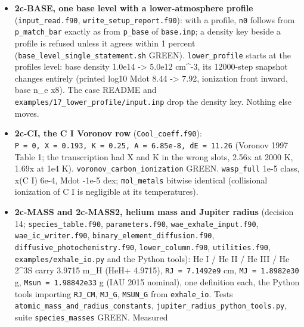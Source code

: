 \documentclass[english,a4paper]{my_memo}
\begin{document}
\begin{itemize}
  \texttt{restart\_grid\_guard.sh} GREEN; \texttt{roundtrip} and the three \texttt{hp\_*} cases
  byte-identical on the same grid. Consequence: after the grid-moving items
  of this batch (RJ +2.26 percent of the domain in R\_p units, \texttt{dr\_j}) the
  shipped \texttt{hp\_*} IC pairs are refused, and are regenerated with
  \texttt{backup/regression/make\_hp\_initial\_conditions.py} from a fresh
  \texttt{mol\_base\_handoff} output (below).
\item
  \textbf{2c-BASE, one base level with a lower-atmosphere profile}
  (\texttt{input\_read.f90}, \texttt{write\_setup\_report.f90}): with a profile, \texttt{n0} follows
  from \texttt{p\_match\_bar} exactly as from \texttt{p\_base} of \texttt{base.inp}; a density key
  beside a profile is refused unless it agrees within 1 percent
  (\texttt{base\_level\_single\_statement.sh} GREEN). \texttt{lower\_profile} starts at the
  profile\textquotesingle s level: base density 1.0e14 -\textgreater{} 5.0e12 cm\^{}-3, its 12000-step
  snapshot changes entirely (printed log10 Mdot 8.44 -\textgreater{} 7.92, ionization
  front inward, base n\_e x8). The case README and
  \texttt{examples/17\_lower\_profile/input.inp} drop the density key. Nothing else
  moves.
\item
  \textbf{2c-CI, the C I Voronov row} (\texttt{Cool\_coeff.f90}): \texttt{P\ =\ 0,\ X\ =\ 0.193,\ K\ =\ 0.25,\ A\ =\ 6.85e-8,\ dE\ =\ 11.26} (Voronov 1997 Table 1; the transcription
  had X and K in the wrong slots, 2.56x at 2000 K, 1.69x at 1e4 K).
  \texttt{voronov\_carbon\_ionization} GREEN. \texttt{wasp\_full} 1e-5 class, x(C I) 6e-4,
  Mdot -1e-5 dex; \texttt{mol\_metals} bitwise identical (collisional ionization of
  C I is negligible at its temperatures).
\item
  \textbf{2c-MASS and 2c-MASS2, helium mass and Jupiter radius} (decision 14;
  \texttt{species\_table.f90}, \texttt{parameters.f90}, \texttt{wae\_exhale\_input.f90},
  \texttt{wae\_ic\_writer.f90}, \texttt{binary\_element\_diffusion.f90},
  \texttt{diffusive\_photochemistry.f90}, \texttt{lower\_column.f90}, \texttt{utilities.f90},
  \texttt{examples/exhale\_io.py} and the Python tools): He I / He II / He III /
  He 2\^{}3S carry 3.9715 m\_H (HeH+ 4.9715), \texttt{RJ\ =\ 7.1492e9} cm, \texttt{MJ\ =\ 1.8982e30} g, \texttt{Msun\ =\ 1.98842e33} g (IAU 2015 nominal), one definition
  each, the Python tools importing \texttt{RJ\_CM}, \texttt{MJ\_G}, \texttt{MSUN\_G} from
  \texttt{exhale\_io}. Tests \texttt{atomic\_mass\_and\_radius\_constants},
  \texttt{jupiter\_radius\_python\_tools.py}, suite \texttt{species\_masses} GREEN. Measured

\end{itemize}
\end{document}
